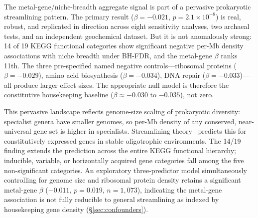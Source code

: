 \documentclass[times]{zHenriquesLab-StyleBioRxiv}
\begin{document}
The metal-gene/niche-breadth aggregate signal is part of a pervasive
prokaryotic streamlining pattern.
The primary result ($\beta = -0.021$, $p = 2.1 \times 10^{-8}$) is real,
robust, and replicated in direction across eight sensitivity analyses, two
archaeal tests, and an independent geochemical dataset. But it is not
anomalously strong: 14 of 19 KEGG functional categories show significant
negative per-Mb density associations with niche breadth under BH-FDR, and the
metal-gene $\beta$ ranks 11th. The three pre-specified named negative
controls---ribosomal proteins ($\beta = -0.029$), amino acid biosynthesis
($\beta = -0.034$), DNA repair ($\beta = -0.033$)---all produce larger effect
sizes. The appropriate null model is therefore the constitutive housekeeping
baseline ($\beta \approx -0.030$ to $-0.035$), not zero.

This pervasive landscape reflects genome-size scaling of prokaryotic diversity:
specialist genera have smaller genomes, so per-Mb density of any conserved,
near-universal gene set is higher in specialists.
Streamlining theory~\cite{giovannoni2014,simonsen2021,peng2025,hao2026}
predicts this for constitutively expressed genes in stable oligotrophic
environments. The 14/19 finding extends the prediction across the entire KEGG
functional hierarchy; inducible, variable, or horizontally acquired gene
categories fall among the five non-significant categories.
An exploratory three-predictor model simultaneously controlling for genome size
and ribosomal protein density retains a significant metal-gene $\beta$
($-0.011$, $p = 0.019$, $n = 1{,}073$), indicating the metal-gene association
is not fully reducible to general streamlining as indexed by housekeeping gene
density (\S\ref{sec:confounders}).
\end{document}
